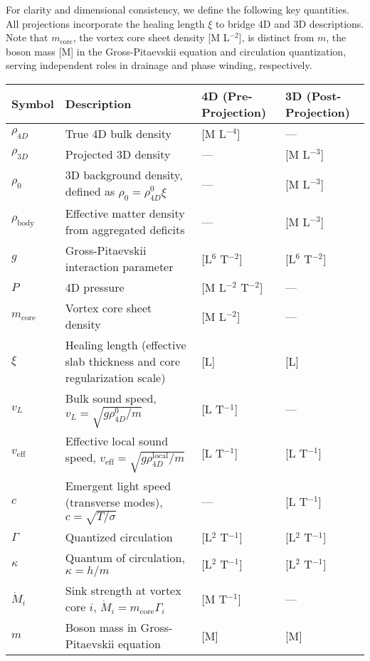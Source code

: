 For clarity and dimensional consistency, we define the following key quantities. All projections incorporate the healing length $\xi$ to bridge 4D and 3D descriptions. Note that $m_{\text{core}}$, the vortex core sheet density [M L$^{-2}$], is distinct from $m$, the boson mass [M] in the Gross-Pitaevskii equation and circulation quantization, serving independent roles in drainage and phase winding, respectively.

\begin{table}[H]
\centering
\begin{tabularx}{\textwidth}{|l|Y|l|l|}
\hline
Symbol & Description & 4D (Pre-Projection) & 3D (Post-Projection) \\
\hline
$\rho_{4D}$ & True 4D bulk density & [M L$^{-4}$] & --- \\
\hline
$\rho_{3D}$ & Projected 3D density & --- & [M L$^{-3}$] \\
\hline
$\rho_0$ & 3D background density, defined as $\rho_0 = \rho_{4D}^0 \xi$ & --- & [M L$^{-3}$] \\
\hline
$\rho_{\text{body}}$ & Effective matter density from aggregated deficits & --- & [M L$^{-3}$] \\
\hline
$g$ & Gross-Pitaevskii interaction parameter & [L$^6$ T$^{-2}$] & [L$^6$ T$^{-2}$] \\
\hline
$P$ & 4D pressure & [M L$^{-2}$ T$^{-2}$] & --- \\
\hline
$m_{\text{core}}$ & Vortex core sheet density & [M L$^{-2}$] & --- \\
\hline
$\xi$ & Healing length (effective slab thickness and core regularization scale) & [L] & [L] \\
\hline
$v_L$ & Bulk sound speed, $v_L = \sqrt{g \rho_{4D}^0 / m}$ & [L T$^{-1}$] & --- \\
\hline
$v_{\text{eff}}$ & Effective local sound speed, $v_{\text{eff}} = \sqrt{g \rho_{4D}^{\text{local}} / m}$ & [L T$^{-1}$] & [L T$^{-1}$] \\
\hline
$c$ & Emergent light speed (transverse modes), $c = \sqrt{T / \sigma}$ & --- & [L T$^{-1}$] \\
\hline
$\Gamma$ & Quantized circulation & [L$^2$ T$^{-1}$] & [L$^2$ T$^{-1}$] \\
\hline
$\kappa$ & Quantum of circulation, $\kappa = h / m$ & [L$^2$ T$^{-1}$] & [L$^2$ T$^{-1}$] \\
\hline
$\dot{M}_i$ & Sink strength at vortex core $i$, $\dot{M}_i = m_{\text{core}} \Gamma_i$ & [M T$^{-1}$] & --- \\
\hline
$m$ & Boson mass in Gross-Pitaevskii equation & [M] & [M] \\

\end{tabularx}
\end{table}
